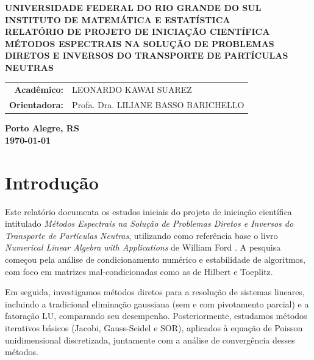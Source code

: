 \documentclass{article}
\theoremstyle{plain}
\theoremstyle{definition}
\theoremstyle{remark}
\begin{document}
\begin{center}
    \textbf{\large UNIVERSIDADE FEDERAL DO RIO GRANDE DO SUL} \\
    \textbf{\large INSTITUTO DE MATEMÁTICA E ESTATÍSTICA} \\
    \vspace{3cm}
    \textbf{\Large RELATÓRIO DE PROJETO DE INICIAÇÃO CIENTÍFICA} \\
    \vspace{1cm}
    \textbf{\large MÉTODOS ESPECTRAIS NA SOLUÇÃO DE PROBLEMAS DIRETOS E INVERSOS DO TRANSPORTE DE PARTÍCULAS NEUTRAS} \\
    \vspace{3cm}

    \begin{tabular}{rl}
        \textbf{Acadêmico:} & LEONARDO KAWAI SUAREZ \\
        \textbf{Orientadora:} & Profa. Dra. LILIANE BASSO BARICHELLO \\
    \end{tabular}

    \vspace{12cm}
    \textbf{\large Porto Alegre, RS} \\
    \textbf{\large \today}
\end{center}

\newpage

\tableofcontents
\newpage

\section{Introdução}

Este relatório documenta os estudos iniciais do projeto de iniciação científica intitulado \emph{Métodos Espectrais na Solução de Problemas Diretos e Inversos do Transporte de Partículas Neutras}, utilizando como referência base o livro \emph{Numerical Linear Algebra with Applications} de William Ford \cite{ford}. A pesquisa começou pela análise de condicionamento numérico e estabilidade de algoritmos, com foco em matrizes mal-condicionadas como as de Hilbert e Toeplitz.

Em seguida, investigamos métodos diretos para a resolução de sistemas lineares, incluindo a tradicional eliminação gaussiana (sem e com pivotamento parcial) e a fatoração LU, comparando seu desempenho. Posteriormente, estudamos métodos iterativos básicos (Jacobi, Gauss-Seidel e SOR), aplicados à equação de Poisson unidimensional discretizada, juntamente com a análise de convergência desses métodos.
\end{document}

